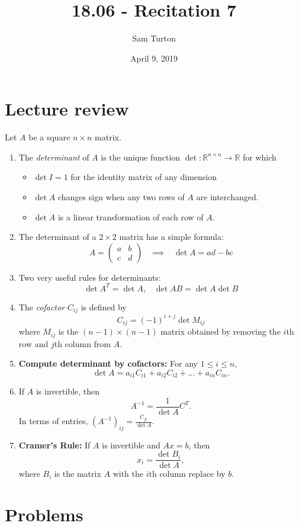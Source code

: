 \documentclass[11pt]{article}
\title{18.06 - Recitation 7}
\author{Sam Turton}
\date{April 9, 2019}
\begin{document}
\maketitle

\section{Lecture review}
Let $A$ be a square $n\times n$ matrix.
\begin{enumerate}
\item The \emph{determinant} of $A$ is the unique function $\det : \mathbb{R}^{n\times n} \to \mathbb{R}$ for which
\begin{itemize}
\item $\det I = 1$ for the identity matrix of any dimension
\item $\det A$ changes sign when any two rows of $A$ are interchanged.
\item $\det A$ is a linear transformation of each row of $A$.
\end{itemize}
\item The determinant of a $2\times 2$ matrix has a simple formula:
$$\boxed{A = \begin{pmatrix} a & b \\ c & d \end{pmatrix} \;\;\; \implies \;\;\; \det A = ad-bc}$$
\item Two very useful rules for determinants:
$$\boxed{\det A^T = \det A, \;\;\; \det AB = \det A \det B}$$
\item The \emph{cofactor} $C_{ij}$ is defined by
$$\boxed{C_{ij} = (-1)^{i+j} \det M_{ij}}$$
where $M_{ij}$ is the $(n - 1) \times (n - 1)$ matrix obtained by removing the $i$th row and $j$th column from $A$.
\item \textbf{Compute determinant by cofactors:} For any $1 \leq i \leq n$, 
$$\boxed{\det A=a_{i1}C_{i1} +a_{i2}C_{i2} + ... +a_{in}C_{in}.}$$
\item If $A$ is invertible, then
$$\boxed{A^{-1}= \frac{1}{\det A} C^T.}$$
In terms of entries, $(A^{-1})_{ij} = \frac{C_{ji}}{ \det A}$.
\item \textbf{Cramer's Rule:} If $A$ is invertible and $Ax = b$, then
$$\boxed{x_i = \frac{\det B_i}{ \det A},}$$
where $B_i$ is the matrix $A$ with the $i$th column replace by $b$. 
\end{enumerate}

\newpage

\section{Problems}
\end{document}
